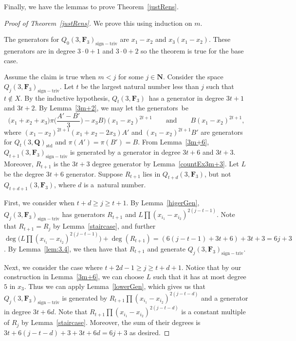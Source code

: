 \documentclass[pdftex]{sigma}
\theoremstyle{definition}
\numberwithin{equation}{section}
\newcommand{\std}{\mathrm{std}}
\newcommand{\siv}{\mathrm{sign-triv}}
\begin{document}
Finally, we have the lemmas to prove Theorem~\ref{justRens}.

\begin{proof}[Proof of Theorem~\ref{justRens}]
 We prove this using induction on $m$.

 The generators for $Q_0(3,\mathbf{F}_3)_{\siv}$ are $x_1-x_2$ and $x_3(x_1-x_2)$. These generators are in degree $3\cdot 0 +1$ and $3\cdot 0 +2$ so the theorem is true for the base case.

 Assume the claim is true when $m<j$ for some $j\in \mathbf{N}$. Consider the space $Q_j(3,\mathbf{F}_3)_{\siv}$. Let $t$ be the largest natural number less than $j$ such that $t\not\in X$. By the inductive hypothesis, $Q_t(3,\mathbf{F}_3)$~has a generator in degree $3t+1$ and $3t+2$. By Lemma~\ref{3m+2}, we may let the generators~be
 \[\biggl(x_1+x_2+x_3)\pi\biggl(\frac{A'-B'}{3}\biggr)-x_3B\biggr)(x_1-x_2)^{2t+1}\qquad
 \text{and}\qquad
 B(x_1-x_2)^{2t+1},\]
 where $(x_1-x_2)^{2t+1}(x_1+x_2-2x_3)A'$ and $(x_1-x_2)^{2t+1}B'$ are generators for $Q_t(3,\mathbf{Q})_{\std}$ and $\pi(A')=\pi(B')=B$. From Lemma~\ref{3m+6}, $Q_{t+1}(3,\mathbf{F}_3)_{\siv}$ is generated by a generator in degree ${3t+6}$ and $3t+3$. Moreover, $R_{t+1}$ is the $3t+3$ degree generator by Lemma~\ref{countEx3m+3}. Let $L$ be the degree $3t+6$ generator. Suppose $R_{t+1}$ lies in $Q_{t+d}(3,\mathbf{F}_3)$, but not $Q_{t+d+1}(3,\mathbf{F}_3)$, where $d$ is a~natural number.

 First, we consider when $t+d\geq j\geq t+1$. By Lemma~\ref{higerGen}, $Q_j(3,\mathbf{F}_3)_{\siv}$ has generators $R_{t+1}$ and $L\prod (x_{i_1}-x_{i_2})^{2(j-t-1)}$. Note that $R_{t+1}=R_{j}$ by Lemma~\ref{staircase}, and further $\deg\big(L\prod (x_{i_1}-x_{i_2})^{2(j-t-1)}\big) + \deg(R_{t+1}) = (6(j-t-1) + 3t+6)+3t+3=6j+3$. By Lemma~\ref{lem:3.4}, we then have that $R_{t+1}$ and  generate $Q_j(3,\mathbf{F}_3)_{\siv}$.

 Next, we consider the case where $t+2d-1\geq j\geq t+d+1$. Notice that by our construction in Lemma~\ref{3m+6}, we can choose $L$ such that it has at most degree $5$ in $x_3$. Thus we can apply Lemma~\ref{lowerGen}, which gives us that $Q_j(3,\mathbf{F}_3)_{\siv}$ is generated by $R_{t+1}\prod (x_{i_1}-x_{i_2})^{2(j-t-d)}$ and a generator in degree $3t+6d$. Note that $R_{t+1}\prod (x_{i_1}-x_{i_2})^{2(j-t-d)}$ is a constant multiple of $R_j$ by Lemma~\ref{staircase}. Moreover, the sum of their degrees is $3t+6(j-t-d)+3+3t+6d=6j+3$ as desired.


\end{proof}
\end{document}
